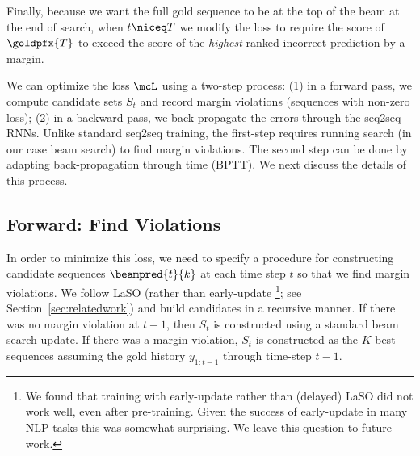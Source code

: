Finally, because we want the full gold sequence to be at the top of the beam at the end of search, when $t \niceq T$ we modify the loss to require the score of $\goldpfx{T}$ to exceed the score of the \textit{highest} ranked incorrect prediction by a margin.

We can optimize the loss $\mcL$ using a two-step process: (1) in a forward pass, we compute candidate sets $S_t$ and record margin violations (sequences with non-zero loss); (2) in a backward pass, we back-propagate the errors through the seq2seq RNNs.
Unlike standard seq2seq training, the first-step requires running
search (in our case beam search) to find margin violations. The second
step can be done by adapting back-propagation through time (BPTT). 
We next discuss the details of this process.




\subsection{Forward: Find Violations} 
\label{sec:forward}
In order to minimize this loss, we need to specify a procedure for
constructing candidate sequences $\beampred{t}{k}$ at each time step
$t$ so that we find margin violations. We follow LaSO (rather than
early-update \footnote{We found that training with early-update rather than (delayed)
LaSO did not work well, even after pre-training. Given the success of early-update
in many NLP tasks this was somewhat surprising. We leave this question to future work.}; see Section~\ref{sec:relatedwork}) and build candidates
in a recursive manner. If there was no margin violation at $t{-}1$,
then $S_t$ is constructed using a standard beam search update. If
there was a margin violation, $S_t$ is constructed as the $K$ best
sequences assuming the gold history $y_{1:t-1}$ through time-step $t{-}1$.


